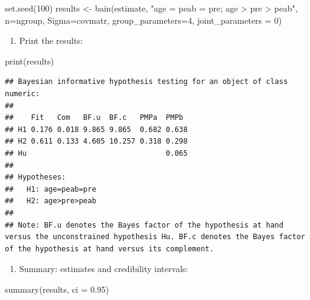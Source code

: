 \documentclass[
]{book}
\newenvironment{Shaded}{\begin{snugshade}}{\end{snugshade}}
\newcommand{\AttributeTok}[1]{\textcolor[rgb]{0.77,0.63,0.00}{#1}}
\newcommand{\DecValTok}[1]{\textcolor[rgb]{0.00,0.00,0.81}{#1}}
\newcommand{\FloatTok}[1]{\textcolor[rgb]{0.00,0.00,0.81}{#1}}
\newcommand{\FunctionTok}[1]{\textcolor[rgb]{0.00,0.00,0.00}{#1}}
\newcommand{\NormalTok}[1]{#1}
\newcommand{\OtherTok}[1]{\textcolor[rgb]{0.56,0.35,0.01}{#1}}
\newcommand{\StringTok}[1]{\textcolor[rgb]{0.31,0.60,0.02}{#1}}
\providecommand{\tightlist}{%
  \setlength{\itemsep}{0pt}\setlength{\parskip}{0pt}}
\begin{document}
\begin{Shaded}
\begin{Highlighting}[]
\FunctionTok{set.seed}\NormalTok{(}\DecValTok{100}\NormalTok{)}
\NormalTok{results }\OtherTok{\textless{}{-}} \FunctionTok{bain}\NormalTok{(estimate, }\StringTok{"age = peab = pre; age \textgreater{} pre \textgreater{} peab"}\NormalTok{, }\AttributeTok{n=}\NormalTok{ngroup,}
\AttributeTok{Sigma=}\NormalTok{covmatr, }\AttributeTok{group\_parameters=}\DecValTok{4}\NormalTok{, }\AttributeTok{joint\_parameters =} \DecValTok{0}\NormalTok{)}
\end{Highlighting}
\end{Shaded}

\begin{enumerate}
\def\labelenumi{\arabic{enumi})}
\setcounter{enumi}{4}
\tightlist
\item
  Print the results:
\end{enumerate}

\begin{Shaded}
\begin{Highlighting}[]
\FunctionTok{print}\NormalTok{(results)}
\end{Highlighting}
\end{Shaded}

\begin{verbatim}
## Bayesian informative hypothesis testing for an object of class numeric:
## 
##    Fit   Com   BF.u  BF.c   PMPa  PMPb 
## H1 0.176 0.018 9.865 9.865  0.682 0.638
## H2 0.611 0.133 4.605 10.257 0.318 0.298
## Hu                                0.065
## 
## Hypotheses:
##   H1: age=peab=pre
##   H2: age>pre>peab
## 
## Note: BF.u denotes the Bayes factor of the hypothesis at hand versus the unconstrained hypothesis Hu. BF.c denotes the Bayes factor of the hypothesis at hand versus its complement.
\end{verbatim}

\begin{enumerate}
\def\labelenumi{\arabic{enumi})}
\setcounter{enumi}{5}
\tightlist
\item
  Summary: estimates and credibility intervals:
\end{enumerate}

\begin{Shaded}
\begin{Highlighting}[]
\FunctionTok{summary}\NormalTok{(results, }\AttributeTok{ci =} \FloatTok{0.95}\NormalTok{)}
\end{Highlighting}
\end{Shaded}
\end{document}
